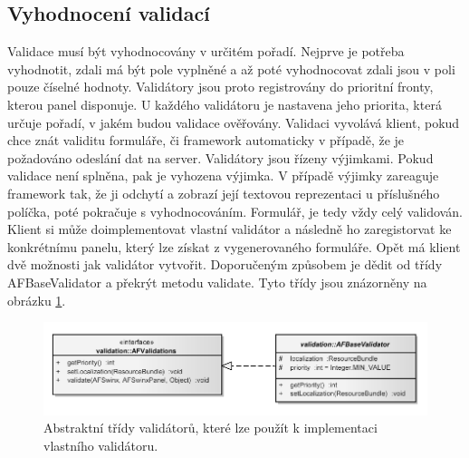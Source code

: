 \subsection{Vyhodnocení validací}
Validace musí být vyhodnocovány v určitém pořadí. Nejprve je potřeba vyhodnotit, zdali má být pole vyplněné a až poté vyhodnocovat zdali jsou v poli pouze číselné hodnoty. Validátory jsou proto registrovány do prioritní fronty, kterou panel disponuje. U každého validátoru je nastavena jeho priorita, která určuje pořadí, v jakém budou validace ověřovány. Validaci vyvolává klient, pokud chce znát validitu formuláře, či framework automaticky v případě, že je požadováno odeslání dat na server. Validátory jsou řízeny výjimkami. Pokud validace není splněna, pak je vyhozena výjimka. V případě výjimky zareaguje framework tak, že ji odchytí a zobrazí její textovou reprezentaci u příslušného políčka, poté pokračuje s vyhodnocováním. Formulář, je tedy vždy celý validován. Klient si může doimplementovat vlastní validátor a následně ho zaregistorvat ke konkrétnímu panelu, který lze získat z vygenerovaného formuláře. Opět má klient dvě možnosti jak validátor vytvořit. Doporučeným způsobem je dědit od třídy AFBaseValidator a překrýt metodu validate. Tyto třídy jsou znázorněny na obrázku \ref{img:validationModel}.
\begin{figure}[h!]
\includegraphics{images/validationModel}
\caption{Abstraktní třídy validátorů, které lze použít k implementaci vlastního validátoru.}
\label{img:validationModel}
\end{figure}

